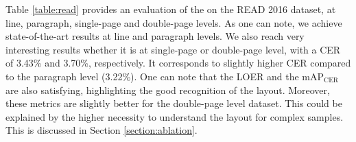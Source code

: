 Table \ref{table:read} provides an evaluation of the \modelacc{} on the READ 2016 dataset, at line, paragraph, single-page and double-page levels. As one can note, we achieve state-of-the-art results at line and paragraph levels. We also reach very interesting results whether it is at single-page or double-page level, with a CER of 3.43\% and 3.70\%, respectively. It corresponds to slightly higher CER compared to the paragraph level (3.22\%).
One can note that the LOER and the $\mathrm{mAP}_\mathrm{CER}$ are also satisfying, highlighting the good recognition of the layout. Moreover, these metrics are slightly better for the double-page level dataset. This could be explained by the higher necessity to understand the layout for complex samples. This is discussed in Section \ref{section:ablation}.

\begin{table*}[ht]
    \caption{Evaluation of the DAN on the test set of the READ 2016 dataset and comparison with the state-of-the-art approaches}
    \centering
\end{table*}
